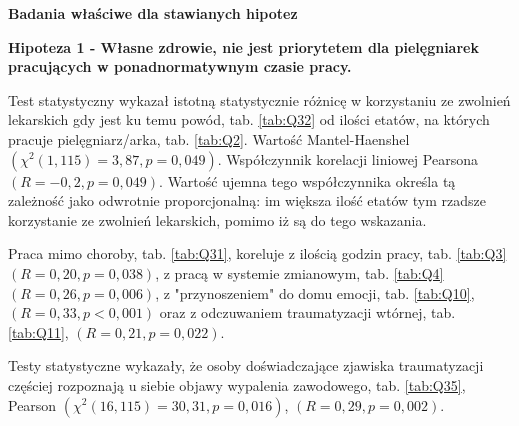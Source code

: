 \documentclass[a4paper,12pt,twoside,openright]{mwrep}
\begin{document}













\vspace{\baselineskip} 


\vspace{\baselineskip} 
\large
\textbf{Badania właściwe dla stawianych hipotez}
\normalsize
\vspace{\baselineskip} 

\vspace{\baselineskip} 
\textbf{Hipoteza 1 - Własne zdrowie, nie jest priorytetem dla pielęgniarek pracujących w ponadnormatywnym czasie pracy.}
\vspace{\baselineskip} 

Test statystyczny wykazał istotną statystycznie różnicę w korzystaniu ze zwolnień lekarskich gdy jest ku temu powód, tab. \ref{tab:Q32} od ilości etatów,  na których pracuje pielęgniarz/arka, tab. \ref{tab:Q2}. Wartość Mantel-Haenshel $(\chi^2 (1, 115) = 3,87, p=0,049)$. Współczynnik korelacji liniowej Pearsona $(R = -0,2, p=0,049)$. Wartość ujemna tego współczynnika określa tą zależność jako odwrotnie proporcjonalną: im większa ilość etatów tym rzadsze korzystanie ze zwolnień lekarskich, pomimo iż są do tego wskazania.


Praca mimo choroby, tab. \ref{tab:Q31}, koreluje z ilością godzin pracy, tab. \ref{tab:Q3} $(R = 0,20, p = 0,038)$, z pracą w systemie zmianowym, tab. \ref{tab:Q4} $(R = 0,26, p = 0,006)$, z "przynoszeniem" do domu emocji, tab. \ref{tab:Q10}, $(R = 0,33, p < 0,001)$ oraz z odczuwaniem traumatyzacji wtórnej, tab. \ref{tab:Q11}, $(R = 0,21, p = 0,022)$.

Testy statystyczne wykazały, że osoby doświadczające zjawiska traumatyzacji częściej rozpoznają u siebie objawy wypalenia zawodowego, tab. \ref{tab:Q35}, 
Pearson $(\chi^2 (16, 115) = 30,31, p=0,016)$, $(R = 0,29, p = 0,002)$.
\end{document}
